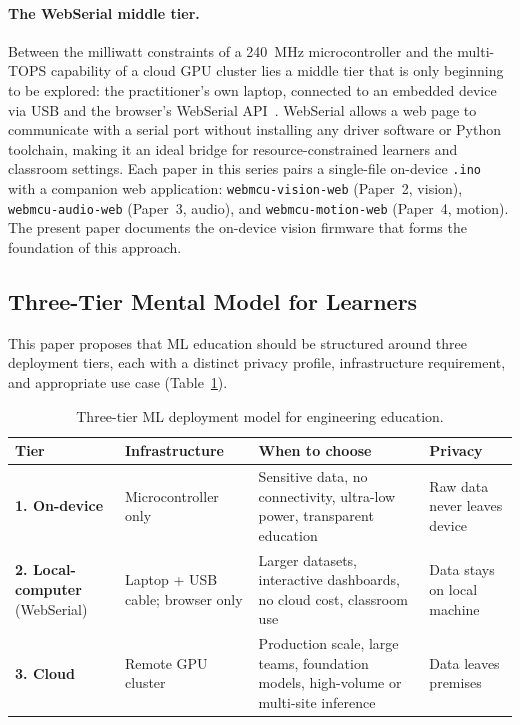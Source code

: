 \documentclass[12pt]{article}
\begin{document}
\paragraph{The WebSerial middle tier.}
Between the milliwatt constraints of a 240~MHz microcontroller and the
multi-TOPS capability of a cloud GPU cluster lies a middle tier that is only
beginning to be explored: the practitioner's own laptop, connected to an
embedded device via USB and the browser's WebSerial
API~\cite{webserial2024}.
WebSerial allows a web page to communicate with a serial port without installing
any driver software or Python toolchain, making it an ideal bridge for
resource-constrained learners and classroom settings.
Each paper in this series pairs a single-file on-device \texttt{.ino} with a
companion web application: \texttt{webmcu-vision-web} (Paper~2, vision),
\texttt{webmcu-audio-web} (Paper~3, audio), and \texttt{webmcu-motion-web}
(Paper~4, motion).
The present paper documents the on-device vision firmware that forms the
foundation of this approach.

\subsection{Three-Tier Mental Model for Learners}
\label{subsec:tiers}

This paper proposes that ML education should be structured around three deployment tiers,
each with a distinct privacy profile, infrastructure requirement, and appropriate
use case (Table~\ref{tab:tiers}).

\begin{table}[H]
\centering
\caption{Three-tier ML deployment model for engineering education.}
\label{tab:tiers}
\begin{tabular}{p{2.7cm} p{3.4cm} p{3.7cm} p{3.2cm}}
\toprule
\textbf{Tier} & \textbf{Infrastructure} & \textbf{When to choose} & \textbf{Privacy} \\
\midrule
\textbf{1. On-device}
  & Microcontroller only
  & Sensitive data, no connectivity, ultra-low power, transparent education
  & Raw data never leaves device \\
\addlinespace
\textbf{2. Local-computer} (WebSerial)
  & Laptop + USB cable; browser only
  & Larger datasets, interactive dashboards, no cloud cost, classroom use
  & Data stays on local machine \\
\addlinespace
\textbf{3. Cloud}
  & Remote GPU cluster
  & Production scale, large teams, foundation models, high-volume or multi-site inference
  & Data leaves premises \\
\bottomrule
\end{tabular}
\end{table}
\end{document}
